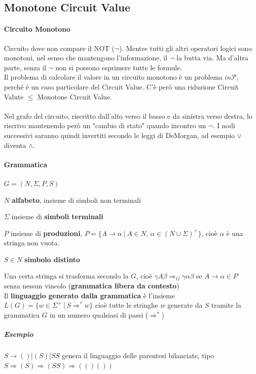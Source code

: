 \documentclass[10pt]{book}
\begin{document}
\subsection{Monotone Circuit Value} \paragraph{Circuito Monotono} Circuito dove non compare il NOT ($\neg$). Mentre tutti gli altri operatori logici sono monotoni, nel senso che mantengono l'informazione, il $\neg$ la butta via. Ma d'altra parte, senza il $\neg$ non si possono esprimere tutte le formule.\\
Il problema di calcolare il valore in un circuito monotono è un problema $in \mathscr{P}$, perché è un caso particolare del Circuit Value. C'è però una riduzione Circuit Valute $\leq$ Monotone Circuit Value.\\\\
Nel grafo del circuito, riscritto dall'alto verso il basso e da sinistra verso destra, lo riscrivo mantenendo però un "cambio di stato" quando incontro un $\neg$. I nodi successivi saranno quindi invertiti secondo le leggi di DeMorgan, ad esempio $\vee$ diventa $\wedge$.
\paragraph{Grammatica} $G = (N, \Sigma, P, S)$
\begin{list}{}{}
	\item $N$ \textbf{alfabeto}, insieme di simboli non terminali
	\item $\Sigma$ insieme di \textbf{simboli terminali}
	\item $P$ insieme di \textbf{produzioni}, $P = \{A\rightarrow\alpha\:|\:A\in N$, $\alpha\in(N\cup\Sigma)^+\}$, cioè $\alpha$ è una stringa non vuota.
	\item $S \in N$ \textbf{simbolo distinto}
\end{list}
Una certa stringa si trasforma secondo la $G$, cioè $\gamma A\beta \Rightarrow_G \gamma\alpha\beta$ se $A \rightarrow \alpha \in P$ senza nessun vincolo (\textbf{grammatica libera da contesto})\\
Il \textbf{linguaggio generato dalla grammatica} è l'insieme $L(G) = \{w\in\Sigma^+ \:|\:S\Rightarrow^* w\}$ cioè tutte le stringhe $w$ generate da $S$ tramite la grammatica $G$ in un numero qualsiasi di passi ($\Rightarrow^*$)
\subparagraph{Esempio} $S \rightarrow () | (S) | SS$ genera il linguaggio delle parentesi bilanciate, tipo $S \Rightarrow (S) \Rightarrow (SS) \Rightarrow (()())$
\end{document}
